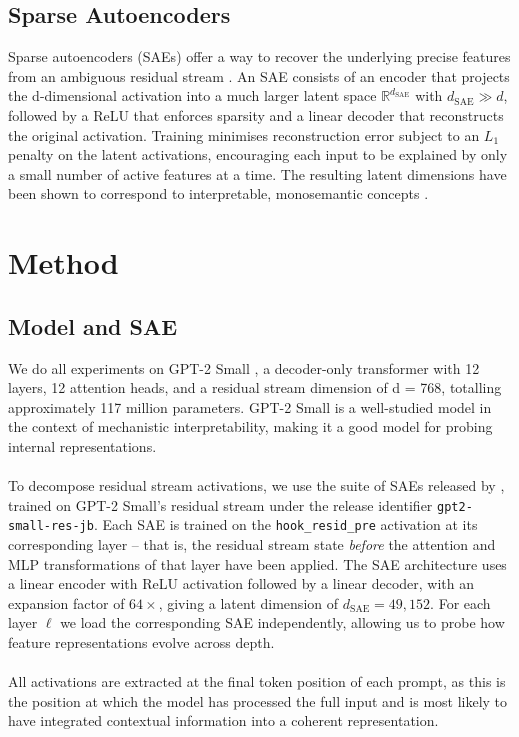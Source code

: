 \documentclass[11pt]{article}
\begin{document}
\subsection{Sparse Autoencoders}
Sparse autoencoders (SAEs) offer a way to recover the underlying precise features from an ambiguous residual stream \cite{cunningham2024sparse}.
An SAE consists of an encoder that projects the d-dimensional activation into a much larger latent space $\mathbb{R}^{d_{\text{SAE}}}$
with $d_{\text{SAE}} \gg d$, followed by a ReLU that enforces sparsity and a linear decoder that reconstructs the original activation.
Training minimises reconstruction error subject to an $L_1$ penalty on the latent activations, encouraging each input to be explained by
only a small number of active features at a time. The resulting latent dimensions have been shown to correspond to interpretable, monosemantic concepts
\cite{cunningham2024sparse, bloom2024gpt2saes}.
\section{Method}


\subsection{Model and SAE}


We do all experiments on GPT-2 Small \cite{radford2019}, a decoder-only transformer with 12 layers, 12 attention heads, and a residual 
stream dimension of d = 768, totalling approximately 117 million parameters. GPT-2 Small is a well-studied model in the context of mechanistic
interpretability, making it a good model for probing internal representations. 
\\
\\
To decompose residual stream activations, we use the suite of SAEs released by \citet{bloom2024gpt2saes}, trained on GPT-2 Small's residual stream
under the release identifier \texttt{gpt2-small-res-jb}. Each SAE is trained on the \texttt{hook\_resid\_pre} activation at its corresponding
layer --  that is, the residual stream state \textit{before} the attention and MLP transformations of that layer have been applied.
The SAE architecture uses a linear encoder with ReLU activation followed by a linear decoder, with an expansion factor of $64\times$, giving a latent dimension 
of $d_{\text{SAE}} = 49{,}152$. For each layer $\ell$ we load the corresponding SAE independently, allowing us to probe how feature representations evolve across 
depth.
\\
\\
All activations are extracted at the final token position of each prompt, as this 
is the position at which the model has processed the full input and is most likely 
to have integrated contextual information into a coherent representation.
\end{document}
